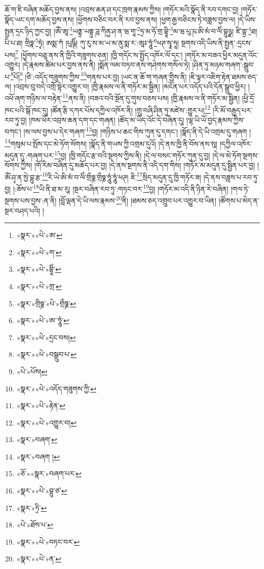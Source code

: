 ཆོ་ག་ཇི་བཞིན་མཆོད་བྱས་ནས། །འབྲས་ཆན་ཤ་དང་ཁྲག་རྣམས་ཀྱིས། །གཏོར་མའི་སྣོད་ནི་རབ་དགང་བྱ། །གཏོར་སྣོད་ཡང་དག་མཆོད་བྱས་ནས། །ཕྱོགས་བཅིང་བར་ནི་རབ་བྱས་ནས། །ཕྱག་རྒྱ་བཅིངས་ཏེ་བཟླས་བྱས་ལ། །དེ་ཡིས་སྤྱན་དྲང་ཉིད་ཀྱང་བྱ། །ཨོཾ་ཨཱ་\footnote{«སྣར་»«པེ་»ཨ་}ཡནྟྲ་ཡནྟུ་ཌཱ་ཀིནྱ་ཤ་ན་ཝ་གཱ་\footnote{«སྣར་»«པེ་»ག་}ཏྲ་མ་ཧོ་གྲ་བྷཱི་\footnote{«སྣར་»«པེ་»བྷཱིཾ་}མ་ཝ་པུ་ཥ་ཨི་མཾ་བ་ལིཾ་བྷུཉྫ། ཛི་གྷྲ་\footnote{«སྣར་»«པེ་»གྲ་}ཐ། པི་པ་ཐ། གྲིཧྣ་\footnote{«སྣར་»གྲིཧྞ་«པེ་»གྲྀཧྞ་}ཏྭཾ། ཨསྨ་ཀཾ །པུཥྚིཾ། ཀུ་རུ་ས་མ་ཡ་མ་ནུ་སྨ་ར་:ཨཱཿ་ཧཱུཾ་\footnote{«སྣར་»«པེ་»ཨ་་ཧཱུཾ་}ཕཊ་སྭཱ་ཧཱ། སྔགས་འདི་ཡིས་ནི་སྤྱན་:དྲངས་པས།\footnote{«སྣར་»«པེ་»དྲང་བས།} །ཕྱོགས་བཅུ་ནས་ནི་ཁྱིའི་གཟུགས་ཅན། །ཁྱི་གདོང་ས་སྤྱོད་འཁོར་ལོ་དང་། །གཏོར་མ་བཟའ་ཕྱིར་མདུན་འོང་འགྱུར། །དེ་རྣམས་ཚིམ་པར་བྱས་ནས་ནི། །སྨོན་ལམ་བཏབ་ནས་གཤེགས་གསོལ་ཏེ། །ཤིན་ཏུ་མཉམ་གཞག་:སྒྲུབ་པ་\footnote{«སྣར་»«པེ་»བསྒྲུབ་པ་}པོ།\footnote{«པེ་»པོས།} །ཅི་:འདོད་གཟུགས་ཀྱིས་\footnote{«སྣར་»«པེ་»འདོད་གཟུགས་ཀྱི་}གནས་པར་བྱ། །ཡང་ན་ཆོ་ག་གཞན་གྱིས་ནི། །ཇི་ལྟར་འཇིག་རྟེན་ཐམས་ཅད་ལ། །འབྲས་བུ་བདེ་འགྲོ་སྟེར་འགྱུར་བ། །ཁྱི་རྣམས་ལ་ནི་གཏོར་མ་སྦྱིན། །མངོན་པར་འདོད་པའི་དོན་སྒྲུབ་ཕྱིར། །འཕོ་ཞག་གཉིས་ལ་བརྟེན་\footnote{«སྣར་»«པེ་»རྟེན་}ནས་ནི། །བཟའ་བའི་སྔོན་དུ་གུས་བཅས་པས། །ཁྱི་རྣམས་ལ་ནི་གཏོར་མ་སྦྱིན། །ཕྱི་དྲོ་ཁང་པའི་སྒོ་ཁང་དུ། །ཚོན་རྩི་དཀར་པོས་དཀྱིལ་འཁོར་ནི། །གྲུ་བཞི་ཤིན་ཏུ་མཛེས་:གྱུར་པ།\footnote{«སྣར་»«པེ་»འགྱུར་བ།} །རི་མོ་བརྒྱད་པར་རབ་ཏུ་བྱ། །ཁམ་ཕོར་འབྲས་ཆན་དག་དང་གཞན། །ཚོད་མ་ཡིད་འོང་དེ་བཞིན་དུ། །ལྷ་ཡི་ཡོ་བྱད་རྣམས་ཀྱིས་བཀང་། །ས་ལས་བྱས་པ་དེར་གཞག་\footnote{«སྣར་»བཞག་}བྱ། །གཉིས་པ་ཆང་གིས་ཀུན་དུ་དགང་། །སྣོད་ནི་དེ་ཡི་འགྲམ་དུ་གཞག །\footnote{«སྣར་»བཞག །}གསུམ་པ་སྤོས་དང་མེ་ཏོག་སོགས། །སྣོད་ནི་གཡས་ཀྱི་འགྲམ་དུའོ། །དེ་ནས་ཁྱི་ནི་བོས་ནས་སུ། །དཀྱིལ་འཁོར་མདུན་དུ་:གཞག་པར་\footnote{«ཅོ་»«སྣར་»བཞག་པར་}བྱ། །ཁྱི་གདོང་རྩ་བའི་སྔགས་ཀྱིས་ནི། །དེ་ལ་བསང་གཏོར་ཀུན་དུ་བྱ། །དེ་ལ་མེ་ཏོག་སྔགས་སོགས་ཀྱིས། །གོ་རིམ་བཞིན་དུ་མཆོད་པར་བྱ། །དེ་ནས་སྔགས་ནི་འདི་དག་གིས། །གཏོར་མ་མདུན་དུ་སྦྱིན་པར་བྱ། །ཨོཾ་ཤྭ་ན་སྱེ་བྷུ་རྩ་\footnote{«སྣར་»«པེ་»བྷུ་ཙ་}རི་ཡེ་ཨི་མཾ་བ་ལིཾ་གྲྀཧྞ་གྲྀཧྞ་ཧཱུཾ་ཧཱུཾ་ཕཊ། ཇི་\footnote{«སྣར་»ཏྲི་}སྲིད་མདུན་དུ་ཁྱི་གཏོར་ཟ། །དེ་ནས་བཟླས་པ་རབ་ཏུ་བྱ། །:ཟོས་པ་\footnote{«པེ་»ཐོས་པ་}ཡི་ནི་ཐ་མ་རུ། །སྔར་བཞིན་རབ་ཏུ་:གཏང་བར་\footnote{«སྣར་»«པེ་»བཏང་བར་}བྱ། །གཏོར་མ་འདི་ནི་ཉིན་རེ་བཞིན། །གལ་ཏེ་སྔགས་པས་བྱས་:ན་ནི། །བློ་ལྡན་དེ་ཡི་ལས་རྣམས་\footnote{«སྣར་»«པེ་»ན་}ནི། །ཐམས་ཅད་འགྲུབ་པར་འགྱུར་བ་ཡིན། །ཚོགས་པ་མེད་ན་སྔར་བཤད་པའི། །
